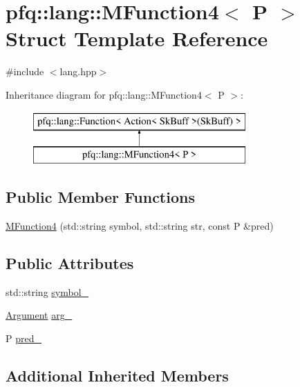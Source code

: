\hypertarget{structpfq_1_1lang_1_1MFunction4}{\section{pfq\+:\+:lang\+:\+:M\+Function4$<$ P $>$ Struct Template Reference}
\label{structpfq_1_1lang_1_1MFunction4}
}


{\ttfamily \#include $<$lang.\+hpp$>$}

Inheritance diagram for pfq\+:\+:lang\+:\+:M\+Function4$<$ P $>$\+:\begin{figure}[H]
\begin{center}
\leavevmode
\includegraphics[height=2.000000cm]{structpfq_1_1lang_1_1MFunction4}
\end{center}
\end{figure}
\subsection*{Public Member Functions}
\begin{DoxyCompactItemize}
\item 
\hyperlink{structpfq_1_1lang_1_1MFunction4_a18577cb1115536aecfaf5fca26e4a64b}{M\+Function4} (std\+::string symbol, std\+::string str, const P \&pred)
\end{DoxyCompactItemize}
\subsection*{Public Attributes}
\begin{DoxyCompactItemize}
\item 
std\+::string \hyperlink{structpfq_1_1lang_1_1MFunction4_a378305b806200784b8edbb3511cc0ea9}{symbol\+\_\+}
\item 
\hyperlink{structpfq_1_1lang_1_1Argument}{Argument} \hyperlink{structpfq_1_1lang_1_1MFunction4_a0c8869c04320155c823b170238fe3328}{arg\+\_\+}
\item 
P \hyperlink{structpfq_1_1lang_1_1MFunction4_afab1d0698ee0f15d8b68a04758d95420}{pred\+\_\+}
\end{DoxyCompactItemize}
\subsection*{Additional Inherited Members}


